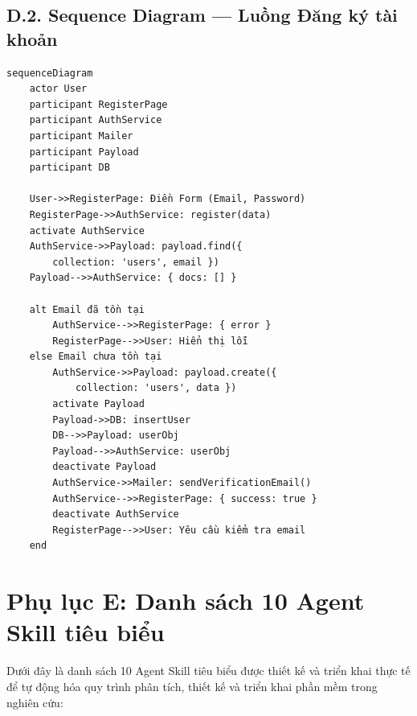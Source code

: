\documentclass[13pt,a4paper,oneside]{extreport}
\numberwithin{equation}{chapter}
\numberwithin{figure}{chapter}
\numberwithin{table}{chapter}
\begin{document}
\subsection*{D.2. Sequence Diagram — Luồng Đăng ký tài khoản}

\begin{verbatim}
sequenceDiagram
    actor User
    participant RegisterPage
    participant AuthService
    participant Mailer
    participant Payload
    participant DB

    User->>RegisterPage: Điền Form (Email, Password)
    RegisterPage->>AuthService: register(data)
    activate AuthService
    AuthService->>Payload: payload.find({
        collection: 'users', email })
    Payload-->>AuthService: { docs: [] }

    alt Email đã tồn tại
        AuthService-->>RegisterPage: { error }
        RegisterPage-->>User: Hiển thị lỗi
    else Email chưa tồn tại
        AuthService->>Payload: payload.create({
            collection: 'users', data })
        activate Payload
        Payload->>DB: insertUser
        DB-->>Payload: userObj
        Payload-->>AuthService: userObj
        deactivate Payload
        AuthService->>Mailer: sendVerificationEmail()
        AuthService-->>RegisterPage: { success: true }
        deactivate AuthService
        RegisterPage-->>User: Yêu cầu kiểm tra email
    end
\end{verbatim}

\section*{Phụ lục E: Danh sách 10 Agent Skill tiêu biểu}

Dưới đây là danh sách 10 Agent Skill tiêu biểu được thiết kế và triển khai thực tế để tự động hóa quy trình phân tích, thiết kế và triển khai phần mềm trong nghiên cứu:
\end{document}
